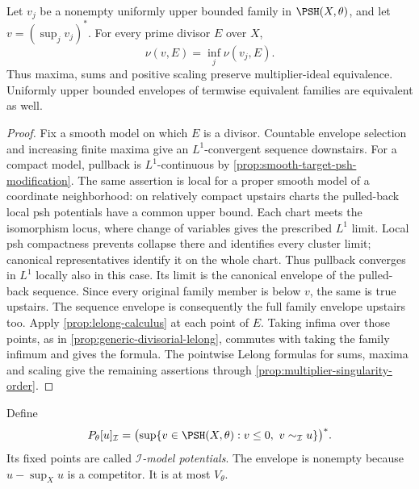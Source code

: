 \begin{lemma}\label{lem:divisorial-envelope-closure}
Let $v_j$ be a nonempty uniformly upper bounded family in $\PSH(X,\theta)$, and let $v=(\sup_jv_j)^*$. For every prime divisor $E$ over $X$,
\[
 \nu(v,E)=\inf_j\nu(v_j,E).
\]
Thus maxima, sums and positive scaling preserve multiplier-ideal equivalence. Uniformly upper bounded envelopes of termwise equivalent families are equivalent as well.
\end{lemma}
\begin{proof}
Fix a smooth model on which $E$ is a divisor. Countable envelope selection and increasing finite maxima give an $L^1$-convergent sequence downstairs. For a compact model, pullback is $L^1$-continuous by \cref{prop:smooth-target-psh-modification}. The same assertion is local for a proper smooth model of a coordinate neighborhood: on relatively compact upstairs charts the pulled-back local psh potentials have a common upper bound. Each chart meets the isomorphism locus, where change of variables gives the prescribed $L^1$ limit. Local psh compactness prevents collapse there and identifies every cluster limit; canonical representatives identify it on the whole chart. Thus pullback converges in $L^1$ locally also in this case. Its limit is the canonical envelope of the pulled-back sequence. Since every original family member is below $v$, the same is true upstairs. The sequence envelope is consequently the full family envelope upstairs too. Apply \cref{prop:lelong-calculus} at each point of $E$. Taking infima over those points, as in \cref{prop:generic-divisorial-lelong}, commutes with taking the family infimum and gives the formula. The pointwise Lelong formulas for sums, maxima and scaling give the remaining assertions through \cref{prop:multiplier-singularity-order}.
\end{proof}

\begin{definition}\label{def:multiplier-ideal-envelope}
Define
\[
 P_\theta[u]_{\mathcal I}
 =\bigl(\sup\{v\in\PSH(X,\theta):v\leq0,
                                      \ v\sim_{\mathcal I}u\}\bigr)^*.
\]
Its fixed points are called \emph{$\mathcal I$-model potentials}. The envelope is nonempty because $u-\sup_Xu$ is a competitor. It is at most $V_\theta$.
\end{definition}

